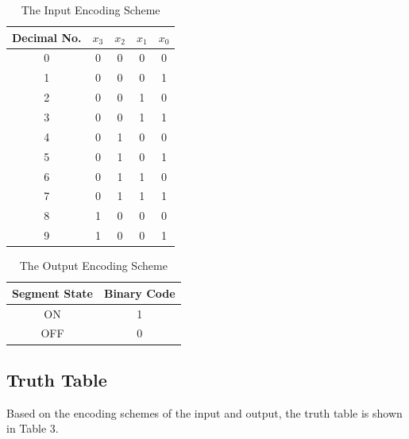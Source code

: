 \documentclass{article}
\begin{document}
\begin{table} [hp]
\begin{center}

\begin{tabular}{ c | c c c c }
\centering

  Decimal No. & $x_3$ & $x_2$ & $x_1$ & $x_0$ \\
  \hline
  0           & 0     & 0     & 0     & 0     \\
  1           & 0     & 0     & 0     & 1     \\
  2           & 0     & 0     & 1     & 0     \\
  3           & 0     & 0     & 1     & 1     \\
  4           & 0     & 1     & 0     & 0     \\
  5           & 0     & 1     & 0     & 1     \\
  6           & 0     & 1     & 1     & 0     \\
  7           & 0     & 1     & 1     & 1     \\
  8           & 1     & 0     & 0     & 0     \\
  9           & 1     & 0     & 0     & 1     \\

\end{tabular}
\caption{The Input Encoding Scheme}
\end{center}
\label{table:1}
\end{table}

\begin{table} [h!]
\begin{center}
\begin{tabular}{ c | c }
\centering

  Segment State & Binary Code \\
  \hline
  ON            & 1           \\
  OFF           & 0           \\

\end{tabular}
\caption{The Output Encoding Scheme}
\end{center}
\label{table:2}
\end{table}


\subsection{Truth Table}
Based on the encoding schemes of the input and output, the truth table is 
shown in Table 3.\\
\end{document}
